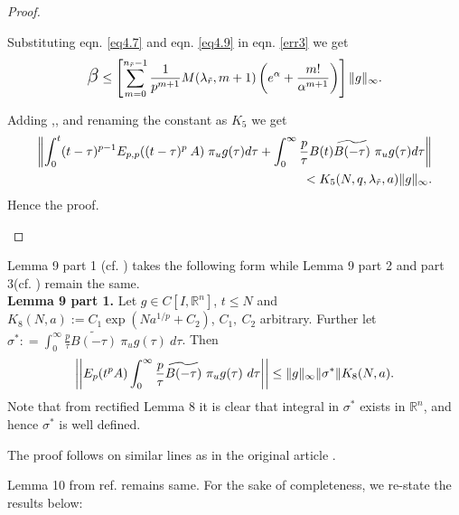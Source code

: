 \begin{proof}
\begin{enumerate}
Substituting eqn. \eqref{eq4.7} and eqn. \eqref{eq4.9} in eqn. \eqref{err3} we get
\begin{align}
\Scale[1.5]{\beta} \leq \left[  \sum_{m=0}^{n_{\tilde{r}}-1} \frac{1}{p^{m+1}}M(\lambda_{\tilde{r}},m+1)\left(  e^{\alpha} + \frac{m!}{\alpha^{m+1}}\right) \right] \inorm{g}.
\end{align}	

Adding \Scale[1.5]{\alpha},\Scale[1.5]{\beta},\Scale[1.5]{\gamma} and renaming the constant as $K_5$ we get
\begin{align}
\begin{split}
\left\| \int_{0}^{t} (t-\tau)^{p-1} E_{p,p}({(t-\tau)^p}\:A)\; \pi_ug(\tau) d\tau + \int_{0}^{\infty}\frac{p}{\tau} B(t)\widetilde{B(-\tau)}~ \pi_ug(\tau) d\tau\right\|\\ < K_5(N,q,\lambda_{\tilde{r}},a)\lVert g\rVert_{\infty}.\end{split} \end{align}
Hence the proof.
\end{enumerate}
\end{proof}
Lemma 9 part 1 (cf. \citep[eqn. (74)]{deshpande2016local}) takes the following form while Lemma 9 part 2 and part 3(cf. \citep[eqn. (75) and eqn. (76)]{deshpande2016local}) remain the same.\\
\textbf{Lemma 9 part 1.} Let $g \in C[I, \mathbb{R}^n]$, $t \leq N$ and $K_8(N,a):= C_1 \exp(N a^{1/p} + C_2)$, $C_1,~ C_2$ arbitrary. Further let  $\sigma^{*}: = \int_{0}^{\infty} \frac{p}{\tau}\widetilde{B(-\tau)}~\pi_u g(\tau)~d\tau$. Then
\begin{equation}
\bigg|\bigg|E_{p}(t^{p} A) \int_{0}^{\infty} \frac{p}{\tau} \widetilde{B(-\tau)}~\pi_u g(\tau) ~d\tau \bigg|\bigg| \leq \lVert g\rVert_{\infty} \lVert \sigma^{*}\rVert K_8(N,a).
\end{equation}
Note that from rectified Lemma 8 it is clear that integral in $\sigma^{*}$ exists in $\mathbb{R}^n$, and hence $\sigma^{*}$ is well defined.

The proof follows on similar lines as in the original article \cite{deshpande2016local}.

 Lemma 10 from ref. \cite{deshpande2016local} remains same. For the sake of completeness, we re-state the results below:
 
